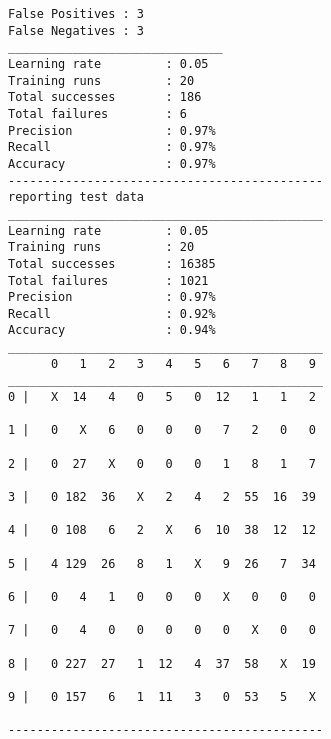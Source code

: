 \documentclass[titlepage,11pt]{article}
\begin{document}
{\begin{verbatim}
False Positives : 3
False Negatives : 3
______________________________
Learning rate         : 0.05
Training runs         : 20
Total successes       : 186
Total failures        : 6
Precision             : 0.97%
Recall                : 0.97%
Accuracy              : 0.97%
--------------------------------------------
reporting test data
____________________________________________
Learning rate         : 0.05
Training runs         : 20
Total successes       : 16385
Total failures        : 1021
Precision             : 0.97%
Recall                : 0.92%
Accuracy              : 0.94%
____________________________________________
      0   1   2   3   4   5   6   7   8   9
____________________________________________
0 |   X  14   4   0   5   0  12   1   1   2

1 |   0   X   6   0   0   0   7   2   0   0

2 |   0  27   X   0   0   0   1   8   1   7

3 |   0 182  36   X   2   4   2  55  16  39

4 |   0 108   6   2   X   6  10  38  12  12

5 |   4 129  26   8   1   X   9  26   7  34

6 |   0   4   1   0   0   0   X   0   0   0

7 |   0   4   0   0   0   0   0   X   0   0

8 |   0 227  27   1  12   4  37  58   X  19

9 |   0 157   6   1  11   3   0  53   5   X

--------------------------------------------
\end{verbatim}
}
\end{document}
